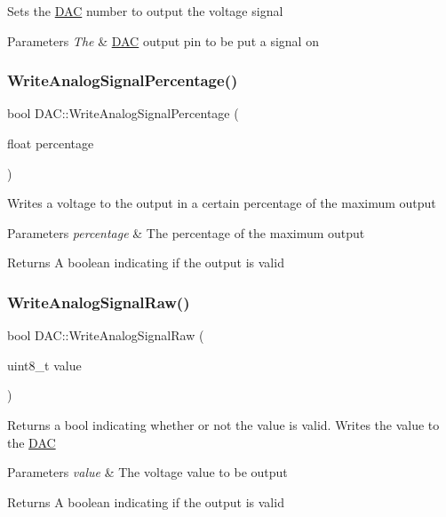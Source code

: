 Sets the \hyperlink{class_d_a_c}{D\+AC} number to output the voltage signal 
\begin{DoxyParams}{Parameters}
{\em The} & \hyperlink{class_d_a_c}{D\+AC} output pin to be put a signal on \\
\hline
\end{DoxyParams}
\hypertarget{class_d_a_c_ab1e74700e0e44e3641e2265380c25347}{}\label{class_d_a_c_ab1e74700e0e44e3641e2265380c25347} 
\subsubsection{\texorpdfstring{Write\+Analog\+Signal\+Percentage()}{WriteAnalogSignalPercentage()}}
{\footnotesize\ttfamily bool D\+A\+C\+::\+Write\+Analog\+Signal\+Percentage (\begin{DoxyParamCaption}\item[{float}]{percentage }\end{DoxyParamCaption})}

Writes a voltage to the output in a certain percentage of the maximum output 
\begin{DoxyParams}{Parameters}
{\em percentage} & The percentage of the maximum output \\
\hline
\end{DoxyParams}
\begin{DoxyReturn}{Returns}
A boolean indicating if the output is valid 
\end{DoxyReturn}
\hypertarget{class_d_a_c_a5bbcde98ffe84c740e562427a14def74}{}\label{class_d_a_c_a5bbcde98ffe84c740e562427a14def74} 
\subsubsection{\texorpdfstring{Write\+Analog\+Signal\+Raw()}{WriteAnalogSignalRaw()}}
{\footnotesize\ttfamily bool D\+A\+C\+::\+Write\+Analog\+Signal\+Raw (\begin{DoxyParamCaption}\item[{uint8\+\_\+t}]{value }\end{DoxyParamCaption})}

Returns a bool indicating whether or not the value is valid. Writes the value to the \hyperlink{class_d_a_c}{D\+AC} 
\begin{DoxyParams}{Parameters}
{\em value} & The voltage value to be output \\
\hline
\end{DoxyParams}
\begin{DoxyReturn}{Returns}
A boolean indicating if the output is valid 
\end{DoxyReturn}


